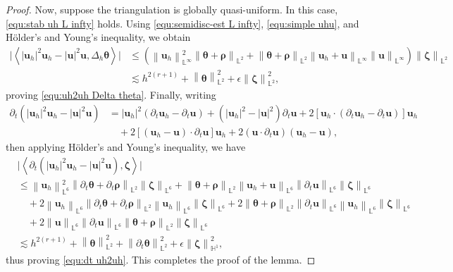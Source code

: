 \documentclass[11pt, reqno]{amsart}
\theoremstyle{definition}
\theoremstyle{remark}
\numberwithin{equation}{section}
\newcommand{\bff}{\boldsymbol}
\newcommand{\bb}{\mathbb}
\newcommand{\norm}[2]{\left\|{#1}\right\|_{#2}}
\newcommand{\inpro}[2]{\left\langle#1,#2\right\rangle}
\newcommand{\abs}[1]{\left|{#1}\right|}
\begin{document}
\begin{proof}
Now, suppose the triangulation is globally quasi-uniform. In this case, \eqref{equ:stab uh L infty} holds. Using \eqref{equ:semidisc-est L infty}, \eqref{equ:simple uhu}, and H\"older's and Young's inequality, we obtain
\begin{align*}
	\big| \inpro{|\bff{u}_h|^2 \bff{u}_h - |\bff{u}|^2 \bff{u}}{\Delta_h \bff{\theta}} \big|
	&\leq
	\left( \norm{\bff{u}_h}{\bb{L}^\infty}^2 \norm{\bff{\theta}+\bff{\rho}}{\bb{L}^2} 
	+
	\norm{\bff{\theta}+\bff{\rho}}{\bb{L}^2} \norm{\bff{u}_h+\bff{u}}{\bb{L}^\infty} \norm{\bff{u}}{\bb{L}^\infty} \right) \norm{\bff{\zeta}}{\bb{L}^2}
	\\
	&\lesssim
	h^{2(r+1)} + \norm{\bff{\theta}}{\bb{L}^2}^2 + \epsilon \norm{\bff{\zeta}}{\bb{L}^2}^2,
\end{align*}
proving \eqref{equ:uh2uh Delta theta}. Finally, writing
\begin{align*}
	\partial_t \left(|\bff{u}_h|^2 \bff{u}_h - |\bff{u}|^2 \bff{u}\right)
	&=
	\abs{\bff{u}_h}^2 (\partial_t \bff{u}_h-\partial_t \bff{u})
	+
	(\abs{\bff{u}_h}^2-\abs{\bff{u}}^2) \partial_t \bff{u}
	+
	2\left[\bff{u}_h \cdot (\partial_t \bff{u}_h-\partial_t \bff{u})\right] \bff{u}_h
	\\
	&\quad
	+
	2 \left[(\bff{u}_h-\bff{u})\cdot \partial_t \bff{u}\right] \bff{u}_h
	+
	2 \left(\bff{u}\cdot \partial_t \bff{u}\right) (\bff{u}_h-\bff{u}),
\end{align*}
then applying H\"older's and Young's inequality, we have
\begin{align*}
	&\big| \inpro{\partial_t \left(|\bff{u}_h|^2 \bff{u}_h - |\bff{u}|^2 \bff{u}\right)}{\bff{\zeta}} \big|
	\\
	&\leq
	\norm{\bff{u}_h}{\bb{L}^6}^2 \norm{\partial_t \bff{\theta}+\partial_t \bff{\rho}}{\bb{L}^2} \norm{\bff{\zeta}}{\bb{L}^6}
	+
	\norm{\bff{\theta}+\bff{\rho}}{\bb{L}^2} \norm{\bff{u}_h+\bff{u}}{\bb{L}^6} \norm{\partial_t \bff{u}}{\bb{L}^6} \norm{\bff{\zeta}}{\bb{L}^6}
	\\
	&\quad
	+
	2 \norm{\bff{u}_h}{\bb{L}^6} \norm{\partial_t \bff{\theta}+\partial_t \bff{\rho}}{\bb{L}^2} \norm{\bff{u}_h}{\bb{L}^6} \norm{\bff{\zeta}}{\bb{L}^6}
	+
	2 \norm{\bff{\theta}+\bff{\rho}}{\bb{L}^2} \norm{\partial_t \bff{u}}{\bb{L}^6} \norm{\bff{u}_h}{\bb{L}^6} \norm{\bff{\zeta}}{\bb{L}^6}
	\\
	&\quad
	+
	2 \norm{\bff{u}}{\bb{L}^6} \norm{\partial_t \bff{u}}{\bb{L}^6} \norm{\bff{\theta}+\bff{\rho}}{\bb{L}^2} \norm{\bff{\zeta}}{\bb{L}^6}
	\\
	&\lesssim
	h^{2(r+1)} + \norm{\bff{\theta}}{\bb{L}^2}^2
	+ \norm{\partial_t \bff{\theta}}{\bb{L}^2}^2
	+
	\epsilon \norm{\bff{\zeta}}{\bb{H}^1}^2,
\end{align*}
thus proving \eqref{equ:dt uh2uh}. This completes the proof of the lemma.
\end{proof}
\end{document}
